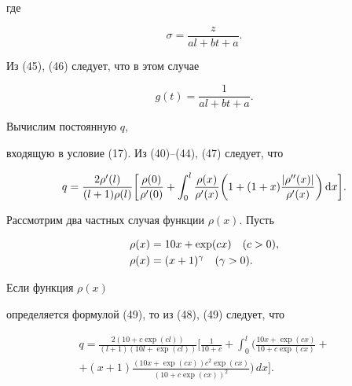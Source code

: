 где


\begin{equation}


\sigma=\frac{z}{al+bt+a}.




\end{equation}


Из (45), (46) следует, что в этом случае


\begin{equation}


g(t)=\frac {1}{al+bt+a}.




\end{equation}


Вычислим постоянную $q$,


входящую в условие (17). Из (40)--(44), (47) следует, что


\begin{equation}


q= \frac {2\rho'(l)}{(l+1)\rho(l)}


\bigg[ \frac {\rho(0)}{\rho'(0)} + \int_0^l \frac


{\rho(x)}{\rho'(x)}


\bigg( 1 + (1+x)\frac {|\rho''(x)|}{\rho'(x)}\bigg)\d


x\bigg].




\end{equation}


Рассмотрим два частных случая функции $\rho(x)$. Пусть


\begin{align}


\rho(x) &= 10x+\exp(cx)\q (c>0), \\




\rho(x) &= (x+1)^{\gamma}\q (\gamma>0).




\end{align}


Если функция $\rho(x)$


определяется формулой (49), то из (48), (49) следует, что


\begin{multline}


q=\frac{2(10+c\exp(cl))}{(l+1)(10l+\exp(cl))}\bigg[\frac{1}{


10+c}+\int_0^l


\bigg(\frac{10x+\exp(cx)}{10+c\exp(cx)}+\\


+(x+1)\frac{(10x+\exp(cx))c^2\exp(cx)}{(10+c\exp(cx))^2


}\bigg)\,dx\bigg].




\end{multline}


